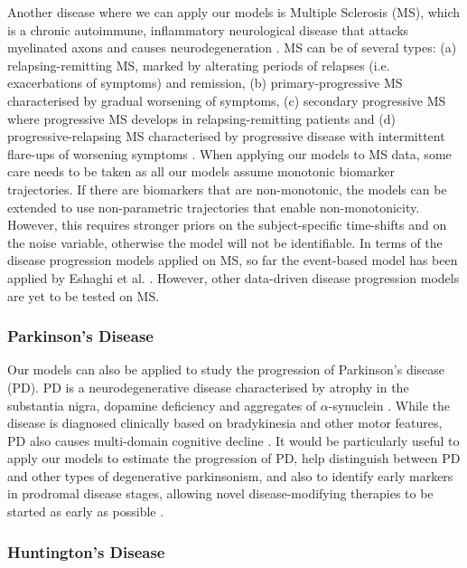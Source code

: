 Another disease where we can apply our models is Multiple Sclerosis (MS), which is a chronic autoimmune, inflammatory neurological disease that attacks myelinated axons and causes neurodegeneration \cite{goldenberg2012multiple}. MS can be of several types: (a) relapsing-remitting MS, marked by alterating periods of relapses (i.e. exacerbations of symptoms) and remission, (b) primary-progressive MS characterised by gradual worsening of symptoms, (c) secondary progressive MS where progressive MS develops in relapsing-remitting patients and (d) progressive-relapsing MS characterised by progressive disease with intermittent flare-ups of worsening symptoms \cite{goldenberg2012multiple}. When applying our models to MS data, some care needs to be taken as all our models assume monotonic biomarker trajectories. If there are biomarkers that are non-monotonic, the models can be extended to use non-parametric trajectories that enable non-monotonicity. However, this requires stronger priors on the subject-specific time-shifts and on the noise variable, otherwise the model will not be identifiable. In terms of the  disease progression models applied on MS, so far the event-based model has been applied by Eshaghi et al. \cite{eshaghi2018progression}. However, other data-driven disease progression models are yet to be tested on MS.

\subsubsection{Parkinson's Disease}

Our models can also be applied to study the progression of Parkinson's disease (PD). PD is a neurodegenerative disease characterised by atrophy in the substantia nigra, dopamine deficiency and aggregates of $\alpha$-synuclein \cite{poewe2017parkinson}. While the disease is diagnosed clinically based on bradykinesia and other motor features, PD also causes multi-domain cognitive decline \cite{caballol2007cognitive, poewe2017parkinson}.  It would be particularly useful to apply our models to estimate the progression of PD, help distinguish between PD and other types of degenerative parkinsonism, and also to identify early markers in prodromal disease stages, allowing novel disease-modifying therapies to be started as early as possible \cite{poewe2017parkinson}.

\subsubsection{Huntington's Disease}

